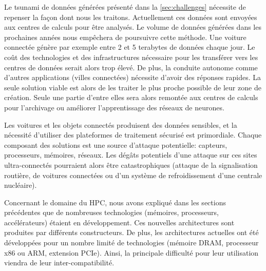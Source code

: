         Le tsunami de données générées présenté dans la \autoref{sec:challenges} nécessite de repenser la façon dont nous les traitons. Actuellement ces données sont envoyées aux centres de calculs pour être analysés. Le volume de données générées dans les prochaines années nous empêchera de poursuivre cette méthode. Une voiture connectée génère par exemple entre 2 et 5 terabytes de données chaque jour. Le coût des technologies et des infrastructures nécessaire pour les transférer vers les centres de données serait alors trop élevé. De plus, la conduite autonome comme d'autres applications (villes connectées) nécessite d'avoir des réponses rapides. La seule solution viable est alors de les traiter le plus proche possible de leur zone de création. Seule une partie d'entre elles sera alors remontée aux centres de calculs pour l'archivage ou améliorer l'apprentissage des réseaux de neurones.
        
        Les voitures et les objets connectés produisent des données sensibles, et la nécessité d'utiliser des plateformes de traitement sécurisé est primordiale. Chaque composant des solutions est une source d’attaque potentielle: capteurs, processeurs, mémoires, réseaux. Les dégâts potentiels d'une attaque sur ces sites ultra-connectés pourraient alors être catastrophiques (attaque de la signalisation routière, de voitures connectées ou d'un système de refroidissement d'une centrale nucléaire).
    
        Concernant le domaine du HPC, nous avons expliqué dans les sections précédentes que de nombreuses technologies (mémoires, processeurs, accélérateurs) étaient en développement. Ces nouvelles architectures sont produites par différents constructeurs. De plus, les architectures actuelles ont été développées pour un nombre limité de technologies (mémoire DRAM, processeur x86 ou ARM, extension PCIe). Ainsi, la principale difficulté pour leur utilisation viendra de leur inter-compatibilité. 
        
       
                

